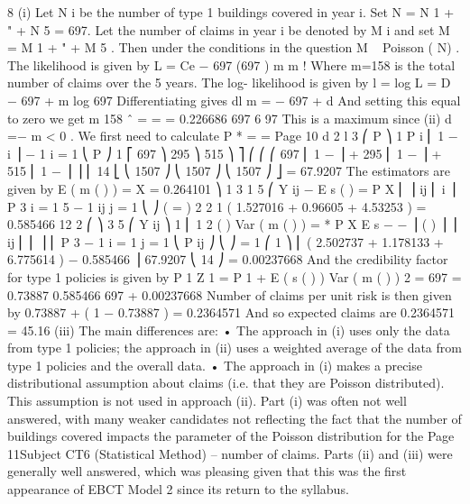 8
(i)
Let N i be the number of type 1 buildings covered in year i. Set
N = N 1 + " + N 5 = 697. Let the number of claims in year i be denoted by M i
and set M = M 1 + " + M 5 . Then under the conditions in the question
M ~ Poisson ( N\lambda  ) .
The likelihood is given by
L = Ce − 697 \lambda 
(697 \lambda  ) m
m !
Where m=158 is the total number of claims over the 5 years. The log-
likelihood is given by
l = log L = D − 697 \lambda  + m log 697 \lambda 
Differentiating gives
dl
m
= − 697 +
d \lambda 
\lambda 
And setting this equal to zero we get
m
158
\lambda  ˆ =
=
= 0.226686
697 6 97
This is a maximum since
(ii)
d 
=−
m
< 0 .
We first need to calculate
P * =
=
Page 10
d 2 l
3
⎛ P ⎞
1
P i ⎜ 1 − i ⎟
  − 1 i = 1 ⎝
P ⎠
1 ⎡
697 ⎞
295 ⎞
515 ⎞ ⎤
⎛
⎛
⎛
697 ⎜ 1 −
⎟ + 295 ⎜ 1 −
⎟ + 515 ⎜ 1 −
⎟ ⎥
⎢
14 ⎣
⎝ 1507 ⎠
⎝ 1507 ⎠
⎝ 1507 ⎠ ⎦%
= 67.9207
The estimators are given by
E ( m ( \theta  ) ) = X = 0.264101
⎞
1 3 1 5 ⎛ Y ij
−
E s ( \theta  ) = \sum 
P
X
⎜
⎟
ij ⎜
i ⎟
P
3 i = 1 5 − 1 \sum 
ij
j = 1 ⎝
⎠
(
=
)
2
2
1
\times  ( 1.527016 + 0.96605 + 4.53253 ) = 0.585466
12
2
⎛
⎞
3 5
⎛ Y ij
⎞
1 ⎜ 1
2
(
)
Var ( m ( \theta  ) ) = *
P
X
E
s
−
−
\theta 
⎟
( ) ⎟ ⎟
ij ⎜
\sum \sum 
⎜
⎟
⎜
P 3  − 1 i = 1 j = 1 ⎝ P ij
⎠
⎝
⎠
=
1
⎛ 1
⎞
\times  ⎜ ( 2.502737 + 1.178133 + 6.775614 ) − 0.585466 ⎟
67.9207 ⎝ 14
⎠
= 0.00237668
And the credibility factor for type 1 policies is given by
P 1
Z 1 =
P 1 +
E ( s ( \theta  ) )
Var ( m ( \theta  ) )
2
=
697
= 0.73887
0.585466
697 +
0.00237668
Number of claims per unit risk is then given by
0.73887  + ( 1 − 0.73887 )  = 0.2364571
And so expected claims are 0.2364571  = 45.16
(iii)
The main differences are:
• The approach in (i) uses only the data from type 1 policies; the approach in
(ii) uses a weighted average of the data from type 1 policies and the overall
data.
• The approach in (i) makes a precise distributional assumption about claims
(i.e. that they are Poisson distributed). This assumption is not used in
approach (ii).
Part (i) was often not well answered, with many weaker candidates not reflecting the fact that
the number of buildings covered impacts the parameter of the Poisson distribution for the
Page 11Subject CT6 (Statistical Method) – %
number of claims. Parts (ii) and (iii) were generally well answered, which was pleasing
given that this was the first appearance of EBCT Model 2 since its return to the syllabus.
